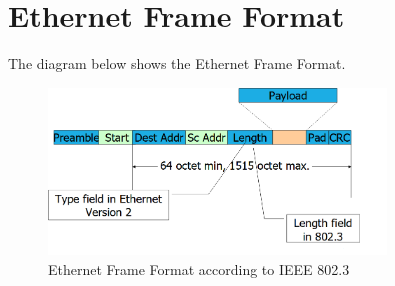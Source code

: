 \section*{Ethernet Frame Format}
The diagram below shows the Ethernet Frame Format.
\begin{figure}[H]
    \centering
    \includegraphics[width=0.8\textwidth]{assets/ethernet-frame-format.png}
    \caption{Ethernet Frame Format according to IEEE 802.3}
\end{figure}